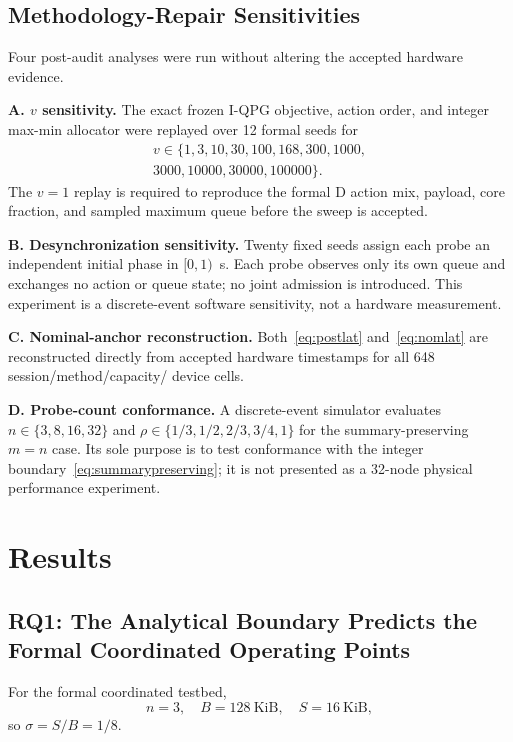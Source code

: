 \documentclass[10pt,journal]{IEEEtran}
\newcommand{\IQPG}{\textsc{I-QPG}}
\begin{document}
\subsection{Methodology-Repair Sensitivities}

Four post-audit analyses were run without altering the accepted hardware
evidence.

\textbf{A. $v$ sensitivity.}
The exact frozen \IQPG{} objective, action order, and integer max-min
allocator were replayed over 12 formal seeds for
\begin{multline}
v\in\{1,3,10,30,100,168,300,1000,\\
3000,10000,30000,100000\}.
\end{multline}
The $v=1$ replay is required to reproduce the formal D action mix,
payload, core fraction, and sampled maximum queue before the sweep is
accepted.

\textbf{B. Desynchronization sensitivity.}
Twenty fixed seeds assign each probe an independent initial phase in
$[0,1)$~s. Each probe observes only its own queue and exchanges no
action or queue state; no joint admission is introduced. This experiment
is a discrete-event software sensitivity, not a hardware measurement.

\textbf{C. Nominal-anchor reconstruction.}
Both~\eqref{eq:postlat} and~\eqref{eq:nomlat} are reconstructed directly
from accepted hardware timestamps for all 648 session/method/capacity/
device cells.

\textbf{D. Probe-count conformance.}
A discrete-event simulator evaluates $n\in\{3,8,16,32\}$ and
$\rho\in\{1/3,1/2,2/3,3/4,1\}$ for the summary-preserving
$m=n$ case. Its sole purpose is to test conformance with the integer
boundary~\eqref{eq:summarypreserving}; it is not presented as a
32-node physical performance experiment.

\section{Results}
\label{sec:results}

\subsection{RQ1: The Analytical Boundary Predicts the Formal
Coordinated Operating Points}

For the formal coordinated testbed,
\[
n=3,\quad B=128~\mathrm{KiB},\quad S=16~\mathrm{KiB},
\]
so $\sigma=S/B=1/8$.
\end{document}
